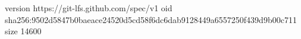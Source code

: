 version https://git-lfs.github.com/spec/v1
oid sha256:9502d5847b0baeace24520d5cd58f6dc6dab9128449a6557250f439d9b00c711
size 14600
